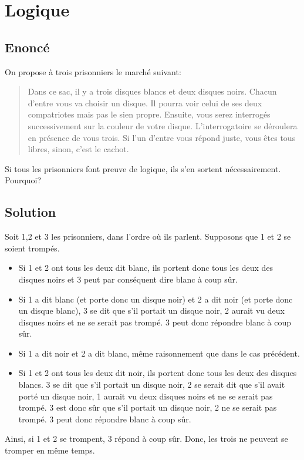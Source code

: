 \documentclass{article}
\newenvironment{statement}{\subsection{Enoncé}}{\pagebreak}
\newenvironment{solution}{\subsection{Solution}}{\pagebreak}
\begin{document}
\section{Logique}
\begin{statement}
On propose à trois prisonniers le marché suivant:
\begin{quote}
Dans ce sac, il y a trois disques blancs et deux disques noirs. Chacun d'entre vous va choisir un disque. Il pourra voir celui de ses deux compatriotes mais pas le sien propre. Ensuite, vous serez interrogés successivement sur la couleur de votre disque. L'interrogatoire se déroulera en présence de vous trois. Si l'un d'entre vous répond juste, vous êtes tous libres, sinon, c'est le cachot.
\end{quote}
Si tous les prisonniers font preuve de logique, ils s'en sortent nécessairement. Pourquoi?
\end{statement}
\begin{solution}
Soit 1,2 et 3 les prisonniers, dans l'ordre où ils parlent. Supposons que 1 et 2 se soient trompés.
\begin{itemize}
\item
Si 1 et 2 ont tous les deux dit blanc, ils portent donc tous les deux des disques noirs et 3 peut par conséquent dire blanc à coup sûr.
\item
Si 1 a dit blanc (et porte donc un disque noir) et 2 a dit noir (et porte donc un disque blanc), 3 se dit que s'il portait un disque noir, 2 aurait vu deux disques noirs et ne se serait pas trompé. 3 peut donc répondre blanc à coup sûr.
\item
Si 1 a dit noir et 2 a dit blanc, même raisonnement que dans le cas précédent.
\item
Si 1 et 2 ont tous les deux dit noir, ils portent donc tous les deux des disques blancs. 3 se dit que s'il portait un disque noir, 2 se serait dit que s'il avait porté un disque noir, 1 aurait vu deux disques noirs et ne se serait pas trompé. 3 est donc sûr que s'il portait un disque noir, 2 ne se serait pas trompé. 3 peut donc répondre blanc à coup sûr.
\end{itemize}
Ainsi, si 1 et 2 se trompent, 3 répond à coup sûr. Donc, les trois ne peuvent se tromper en même temps.
\end{solution}

\end{document}
